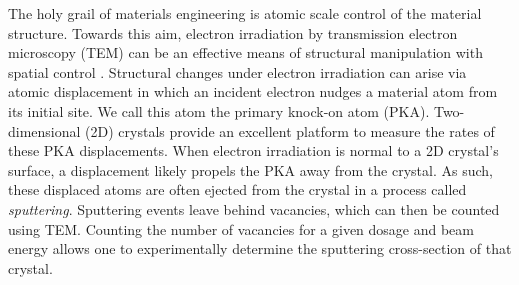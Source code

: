\documentclass{article}
\begin{document}
The holy grail of materials engineering is atomic scale control of the
material structure.
Towards this aim, electron irradiation by transmission electron microscopy
(TEM) can be an effective means of structural manipulation with spatial control
\cite{Banhart1999, Egerton2013, Zhao2017, Susi2019}.
Structural changes under electron irradiation can arise via atomic displacement
in which an incident electron nudges a material atom from its initial site.  We
call this atom the primary knock-on atom (PKA).  Two-dimensional (2D) crystals
provide an excellent platform to measure the rates of these PKA displacements.
When electron irradiation is normal to a 2D crystal's surface, a displacement
likely propels the PKA away from the crystal.
As such, these displaced atoms are often ejected from the crystal in a process
called \textit{sputtering}.  Sputtering events leave behind vacancies, which
can then be counted using TEM.
Counting the number of vacancies for a given dosage and beam energy allows one
to experimentally determine the sputtering cross-section of that crystal.
\end{document}
